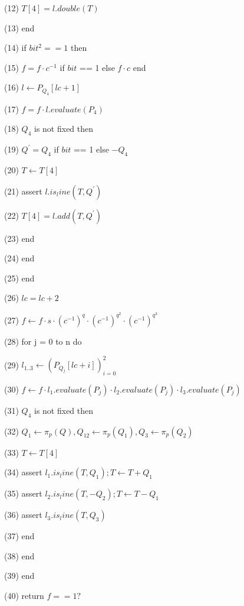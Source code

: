 (12) \indent \indent \indent $\displaystyle T[4] = l.double(T) $ 

(13) \indent \indent end 

(14) \indent \indent if $bit^2 == 1$ then 

(15) \indent \indent \indent $\displaystyle f = f \cdot c^{-1}$ if $bit$ == 1 else $\displaystyle f \cdot c$ end 

(16) \indent \indent \indent $\displaystyle l \leftarrow P_{Q_4}[lc+1] $ 

(17) \indent \indent \indent $\displaystyle f = f \cdot l.evaluate(P_{4})$ 

(18) \indent \indent \indent $Q_4$ is not fixed then 

(19) \indent \indent \indent \indent $\displaystyle Q^{'} = Q_4 $ if $bit$ == 1 else $\displaystyle -Q_4 $ 

(20) \indent \indent \indent $\displaystyle T \leftarrow T[4] $ 

(21) \indent \indent \indent assert $\displaystyle l.is_line(T, Q^{'}) $ 

(22) \indent \indent \indent $\displaystyle T[4] = l.add(T, Q^{'}) $ 

(23) \indent \indent \indent end 

(24) \indent \indent end 

(25) \indent end 

(26) \indent $\displaystyle lc = lc + 2 $ 

(27) \indent $\displaystyle f \leftarrow f \cdot s \cdot (c^{-1})^q \cdot (c^{-1})^{q^2} \cdot (c^{-1})^{q^3} $ 

(28) \indent for j = 0 to n do

(29) \indent \indent $\displaystyle l_{1..3} \leftarrow (P_{Q_j}[lc+i])_{i=0}^2 $ 

(30) \indent \indent $\displaystyle f \leftarrow f \cdot l_1.evaluate(P_{j}) \cdot l_2.evaluate(P_{j}) \cdot l_3.evaluate(P_{j}) $ 

(31) \indent \indent $Q_4$ is not fixed then 

(32) \indent \indent \indent $\displaystyle Q_1 \leftarrow \pi_p(Q), Q_12\leftarrow \pi_p(Q_1), Q_3 \leftarrow \pi_p(Q_2) $ 

(33) \indent \indent \indent $\displaystyle T \leftarrow T[4] $ 

(34) \indent \indent \indent assert $\displaystyle l_1.is_line(T, Q_1); T \leftarrow T + Q_1 $ 

(35) \indent \indent \indent assert $\displaystyle l_2.is_line(T, -Q_2); T \leftarrow T - Q_1 $ 

(36) \indent \indent \indent assert $\displaystyle l_3.is_line(T, Q_3) $ 

(37) \indent \indent end 

(38) \indent end 

(39) end 

(40) return $\displaystyle f == 1? $ 

